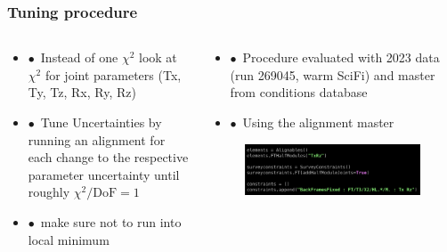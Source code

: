 \documentclass[aspectratio=1610, 12pt, xcolor=dvipsnames]{beamer}
\begin{document}
\begin{frame}\frametitle{Tuning procedure}
  \begin{columns}
    \begin{column}[c]{0.48\textwidth}
      \begin{itemize}
        \setlength\itemsep{0em}
        \item $\bullet$\, Instead of one $\chi^2$ \to look at $\chi^2$ for joint parameters (Tx, Ty, Tz, Rx, Ry, Rz)
        \item $\bullet$\, Tune Uncertainties by running an alignment for each change to the respective parameter uncertainty until roughly $\chi^2 / \text{DoF} = 1$
        \item $\bullet$\, make sure not to run into local minimum
      \end{itemize}
    \end{column}
      \begin{column}[c]{0.48\textwidth}
        \begin{itemize}
          \item $\bullet$\, Procedure evaluated with 2023 data (run 269045, warm SciFi) and master from conditions database
          \item $\bullet$\, Using the alignment master
        \end{itemize}
        \begin{figure}
          \includegraphics[width=\textwidth]{plots/config_joint_constraint.png}
        \end{figure}
      \end{column}
  \end{columns}
\end{frame}
\end{document}
